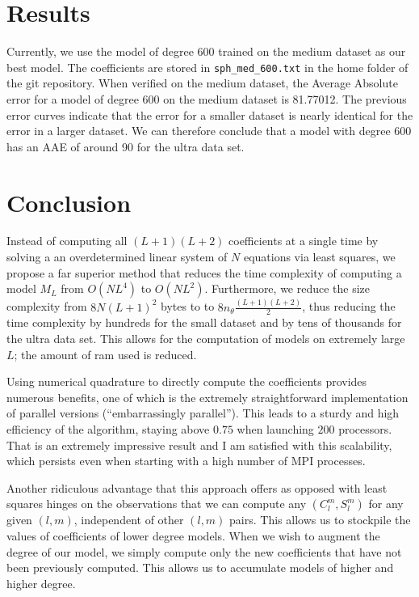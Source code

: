 \documentclass[a4paper]{article}
\theoremstyle{definition}
\begin{document}
\section{Results}

Currently, we use the model of degree 600 trained on the medium dataset as our best model. The coefficients are stored in \texttt{sph\_med\_600.txt}
in the home folder of the git repository. When verified on the medium dataset, the Average Absolute error for a model of degree 600 on the medium dataset is 81.77012.
The previous error curves indicate that the error for a smaller dataset is nearly identical for the error in a larger dataset. We can therefore conclude
that a model with degree 600 has an AAE of around 90 for the ultra data set.


\section{Conclusion}

    Instead of computing all $(L + 1)(L + 2)$ coefficients at a single time by solving a an overdetermined linear system of $N$ equations
    via least squares, we propose a far superior method that reduces the time complexity of computing a model $M_L$ from $O(NL^4)$ to 
    $O(NL^2)$. Furthermore, we reduce the size complexity from $8N(L + 1)^2$ bytes to to $8n_\theta\frac{(L + 1)(L + 2)}{2}$, thus reducing the time 
    complexity by hundreds for the small dataset and by tens of thousands for the ultra data set. This allows for the computation of models
    on extremely large $L$; the amount of ram used is reduced.

    Using numerical quadrature to directly compute the coefficients provides numerous benefits, one of which is the extremely straightforward implementation 
    of parallel versions (``embarrassingly parallel''). This leads to a sturdy and high efficiency of the algorithm, staying above $0.75$ when launching 
    $200$ processors. That is an extremely impressive result and I am satisfied with this scalability, which persists even when starting with a high number of MPI processes.

    Another ridiculous advantage that this approach offers as opposed with least squares hinges on the observations that we can compute any $(C_l^m, S_l^m)$ for any given
    $(l, m)$, independent of other $(l, m)$ pairs. This allows us to stockpile the values of coefficients of lower degree models. When we wish to augment the degree of our model,
    we simply compute only the new coefficients that have not been previously computed. This allows us to accumulate models of higher and higher degree.
\end{document}
